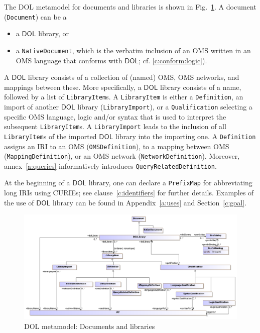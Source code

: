 \documentclass[10pt,fleqn,final]{scrreprt}
\makeatletter
\newcommand*{\cf}{cf.\@\xspace}
\newcommand*{\termref}[1]{\index{#1}#1\xspace}
\newcommand*{\syntax}[1]{\texttt{#1}}
\newcommand*{\DOL}{\ensuremath{\mathsf{DOL}}\xspace}
\newcommand{\clauserefname}{clause}
\newcommand{\cref}[1]{\clauserefname~\ref{#1}}
\newenvironment{definitions}[0]{\medskip }{}
\makeatother
\begin{document}
\begin{definitions}
The DOL metamodel for documents and libraries is shown in Fig.~\ref{fig:libraries}.
A \termref{document} (\syntax{Document}) can be a 
\begin{itemize}
\item a \DOL library, or
\item a \syntax{NativeDocument}, which is the verbatim inclusion of an
  OMS written in an OMS language that conforms with \DOL; \cf
  \ref{c:conform:logic}).
\end{itemize}
A \DOL library consists of a collection of (named)  OMS,  OMS networks, and mappings between these.  More specifically, a \DOL
library consists of a name, followed by a list of
\syntax{LibraryItem}s.  A \syntax{LibraryItem} is either a
\syntax{Definition},
an import of another \DOL library (\syntax{LibraryImport}),
or a \syntax{Qualification} selecting a specific
OMS language, logic and/or syntax that is used to interpret the
subsequent \syntax{LibraryItem}s.  
 A \syntax{LibraryImport} leads to the inclusion of all \syntax{LibraryItem}s of the imported \DOL library into the importing one.
A \syntax{Definition} assigns an IRI to an OMS  (\syntax{OMSDefinition}), 
to a mapping between OMS (\syntax{MappingDefinition}), or
an OMS network  (\syntax{NetworkDefinition}). Moreover, annex~\ref{a:queries}
informatively introduces \syntax{QueryRelatedDefinition}.

At the beginning of a \DOL library, one can declare a \syntax{PrefixMap} for abbreviating long IRIs  using CURIEs; see \cref{c:identifiers} for further details. Examples of the use of \DOL library can be found in Appendix~\ref{a:uses} and Section~\ref{c:goal}.

\medskip
\begin{figure}
  \centering
    \includegraphics[scale=0.47]{mof/libraries.png}
  \caption{DOL metamodel: Documents and libraries}
  \label{fig:libraries}
\end{figure}




\end{definitions}
\end{document}
